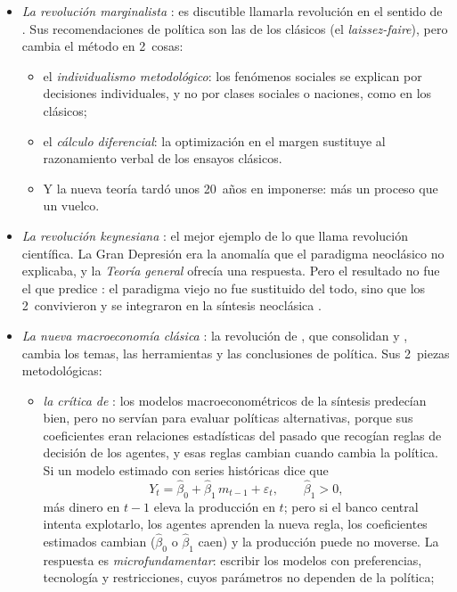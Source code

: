 \documentclass[11pt]{article}
\begin{document}
\begin{itemize}
\item \emph{La revolución marginalista} : es discutible llamarla revolución en el sentido de . Sus recomendaciones de política son las de los clásicos (el \emph{laissez-faire}), pero cambia el método en 2~cosas:
  \begin{itemize}
  \item el \emph{individualismo metodológico}: los fenómenos sociales se explican por decisiones individuales, y no por clases sociales o naciones, como en los clásicos;
  \item el \emph{cálculo diferencial}: la optimización en el margen sustituye al razonamiento verbal de los ensayos clásicos.
  \end{itemize}
  \begin{itemize}
  \item Y la nueva teoría tardó unos 20~años en imponerse: más un proceso que un vuelco\nocite{Blaug1972Marginal}.
  \end{itemize}
\item \emph{La revolución keynesiana} : el mejor ejemplo de lo que  llama revolución científica. La Gran Depresión era la anomalía que el paradigma neoclásico no explicaba, y la \emph{Teoría general} ofrecía una respuesta. Pero el resultado no fue el que predice : el paradigma viejo no fue sustituido del todo, sino que los 2~convivieron y se integraron en la síntesis neoclásica .
\item \emph{La nueva macroeconomía clásica} : la revolución de , que consolidan  y , cambia los temas, las herramientas y las conclusiones de política. Sus 2~piezas metodológicas:
  \begin{itemize}
  \item \emph{la crítica de }\nocite{Lucas1976Econometric}: los modelos macroeconométricos de la síntesis predecían bien, pero no servían para evaluar políticas alternativas, porque sus coeficientes eran relaciones estadísticas del pasado que recogían reglas de decisión de los agentes, y esas reglas cambian cuando cambia la política. Si un modelo estimado con series históricas dice que
    \begin{equation*}
    Y_t=\hat{\beta}_0+\hat{\beta}_1\,m_{t-1}+\varepsilon_t,\qquad \hat{\beta}_1>0,
    \end{equation*}
    más dinero en $t-1$ eleva la producción en $t$; pero si el banco central intenta explotarlo, los agentes aprenden la nueva regla, los coeficientes estimados cambian ($\hat{\beta}_0$ o $\hat{\beta}_1$ caen) y la producción puede no moverse. La respuesta es \emph{microfundamentar}: escribir los modelos con preferencias, tecnología y restricciones, cuyos parámetros no dependen de la política;

\end{itemize}
\end{itemize}
\end{document}
